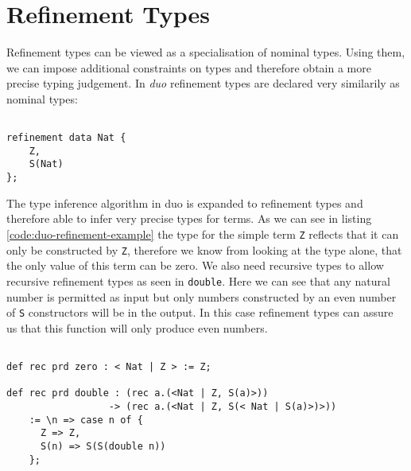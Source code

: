 \section{Refinement Types}
\label{sec:refinement-types}

Refinement types can be viewed as a specialisation of nominal types.
Using them, we can impose additional constraints on types and therefore obtain a more precise typing judgement. \cite{springer} %
In \emph{duo} refinement types are declared very similarily as nominal types:

\begin{lstlisting}[style=duostyle, label=code:duo-refinement-declaration, captionpos=b, caption={Refinement type of peano numbers in \emph{duo}}]

refinement data Nat {
    Z,
    S(Nat)
};

\end{lstlisting}

The type inference algorithm in duo is expanded to refinement types and therefore able to infer very precise types for terms. \cite{binder22refinement}
As we can see in listing \ref{code:duo-refinement-example} the type for the simple term \lstinline{Z} reflects that it can only be constructed by \lstinline{Z}, therefore we know from looking at the type alone, that the only value of this term can be zero.
We also need recursive types to allow recursive refinement types as seen in \lstinline{double}.
Here we can see that any natural number is permitted as input but only numbers constructed by an even number of \lstinline{S} constructors will be in the output.
In this case refinement types can assure us that this function will only produce even numbers.

\begin{lstlisting}[style=duostyle, label=code:duo-refinement-example, captionpos=b, caption={Type inference for refinement types in \emph{duo}}]

def rec prd zero : < Nat | Z > := Z;

def rec prd double : (rec a.(<Nat | Z, S(a)>))
                  -> (rec a.(<Nat | Z, S(< Nat | S(a)>)>))
    := \n => case n of {
      Z => Z,
      S(n) => S(S(double n))
    };
    
\end{lstlisting}

